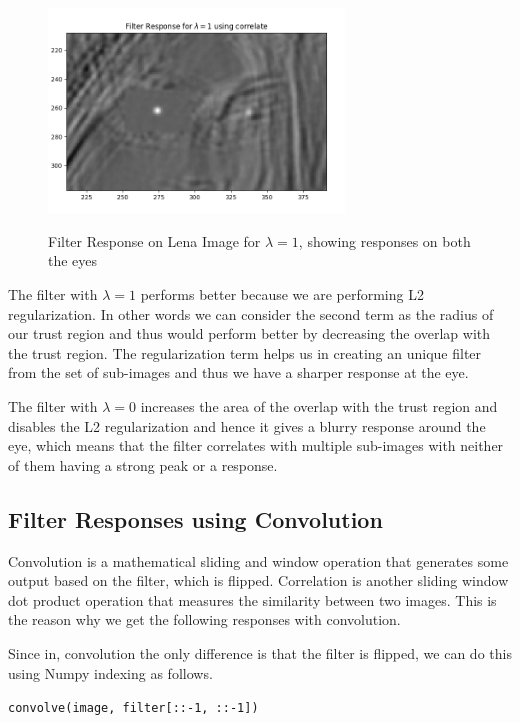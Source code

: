 \documentclass[a4paper]{article}
\begin{document}
\begin{figure}[!ht]
\centering
{\includegraphics[width=0.7\textwidth]{corr-filters/g1_eyes}}
\caption{Filter Response on Lena Image for $\lambda=1$, showing responses on both the eyes}
\end{figure}

\newpage
The filter with $\lambda=1$ performs better because we are performing L2 regularization. In other words we can consider the second term as the radius of our trust region and thus would perform better by decreasing the overlap with the trust region. The regularization term helps us in creating an unique filter from the set of sub-images and thus we have a sharper response at the eye. 

The filter with $\lambda=0$ increases the area of the overlap with the trust region and disables the L2 regularization and hence it gives a blurry response around the eye, which means that the filter correlates with multiple sub-images with neither of them having a strong peak or a response.

\clearpage
\subsection{Filter Responses using Convolution}
Convolution is a mathematical sliding and window operation that generates some output based on the filter, which is flipped. Correlation is another sliding window dot product operation that measures the similarity between two images. This is the reason why we get the following responses with convolution.

Since in, convolution the only difference is that the filter is flipped, we can do this using Numpy indexing as follows.

\begin{center}
    \texttt{convolve(image, filter[::-1, ::-1])}
\end{center}
\end{document}

